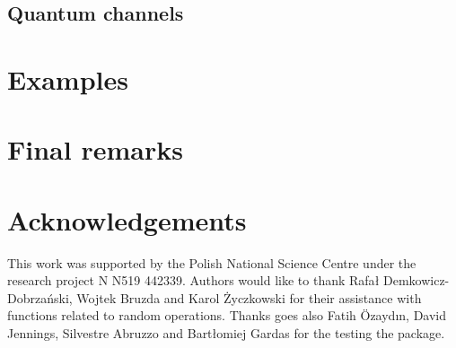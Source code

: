 \documentclass[11pt,a4paper]{article}
\newcommand{\1}{{\bf 1}}
\begin{document}
\subsection{Quantum channels}

\section{Examples}

\section{Final remarks}

\section{Acknowledgements}
This work was supported by the Polish National Science Centre under the research
project N N519 442339. Authors would like to thank Rafa{\l}
Demkowicz-Dobrza\'nski, Wojtek Bruzda and Karol \.Zyczkowski for their
assistance with functions related to random operations. Thanks goes also Fatih
\"Ozayd{\i}n, David Jennings, Silvestre Abruzzo and Bart{\l}omiej Gardas for the
testing the package.



\end{document}
